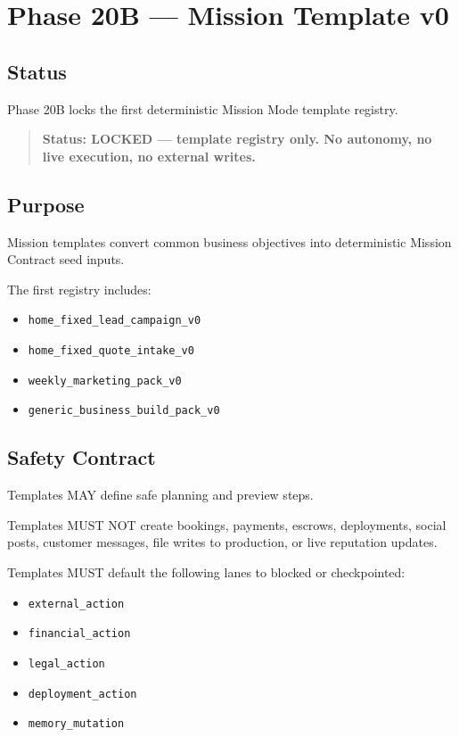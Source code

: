 \section{Phase 20B --- Mission Template v0}
\label{sec:phase20b-mission-template-v0}

\subsection{Status}

Phase 20B locks the first deterministic Mission Mode template registry.

\begin{quote}
\textbf{Status: LOCKED --- template registry only. No autonomy, no live execution, no external writes.}
\end{quote}

\subsection{Purpose}

Mission templates convert common business objectives into deterministic Mission Contract seed inputs.

The first registry includes:

\begin{itemize}
  \item \texttt{home\_fixed\_lead\_campaign\_v0}
  \item \texttt{home\_fixed\_quote\_intake\_v0}
  \item \texttt{weekly\_marketing\_pack\_v0}
  \item \texttt{generic\_business\_build\_pack\_v0}
\end{itemize}

\subsection{Safety Contract}

Templates MAY define safe planning and preview steps.

Templates MUST NOT create bookings, payments, escrows, deployments, social posts, customer messages, file writes to production, or live reputation updates.

Templates MUST default the following lanes to blocked or checkpointed:

\begin{itemize}
  \item \texttt{external\_action}
  \item \texttt{financial\_action}
  \item \texttt{legal\_action}
  \item \texttt{deployment\_action}
  \item \texttt{memory\_mutation}
\end{itemize}

